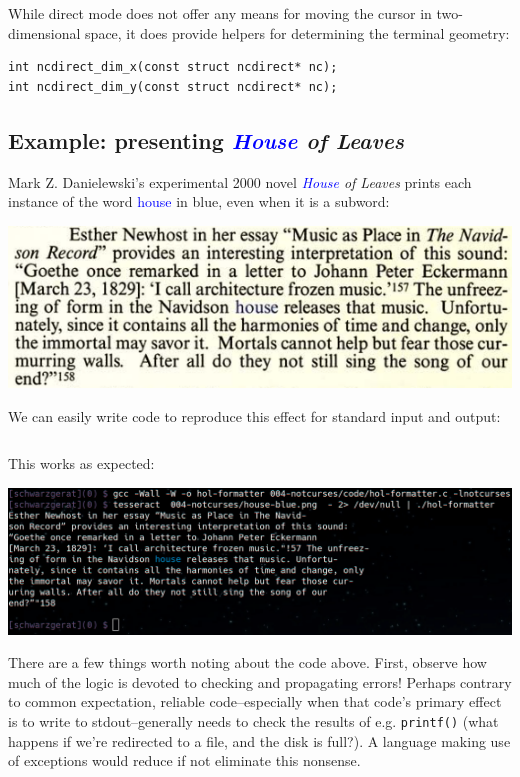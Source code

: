 \documentclass[letterpaper,10pt]{article}
\begin{document}
While direct mode does not offer any means for moving the cursor in
two-dimensional space, it does provide helpers for determining the terminal
geometry:

\begin{verbatim}
int ncdirect_dim_x(const struct ncdirect* nc);
int ncdirect_dim_y(const struct ncdirect* nc);
\end{verbatim}

\subsection{Example: presenting \textit{\textcolor{blue}{House} of Leaves}}

Mark Z. Danielewski's experimental 2000 novel \textit{\textcolor{blue}{House} of Leaves} prints each
instance of the word \textcolor{blue}{house} in blue, even when it is a subword:

\begin{center}
\includegraphics[width=.5\linewidth]{house-blue.png}
\end{center}

We can easily write code to reproduce this effect for standard input and output:

\begin{listing}[ht]
\inputminted[fontsize=\scriptsize]{C}{code/hol-formatter.c}
\end{listing}

This works as expected:

\begin{center}
\includegraphics[width=.75\linewidth]{hol-formatted.png}
\end{center}

There are a few things worth noting about the code above. First, observe how
much of the logic is devoted to checking and propagating errors! Perhaps
contrary to common expectation, reliable code--especially when that code's
primary effect is to write to stdout--generally needs to check the results of
e.g. \texttt{printf()} (what happens if we're redirected to a file, and
the disk is full?). A language making use of exceptions would reduce if not
eliminate this nonsense.
\end{document}
